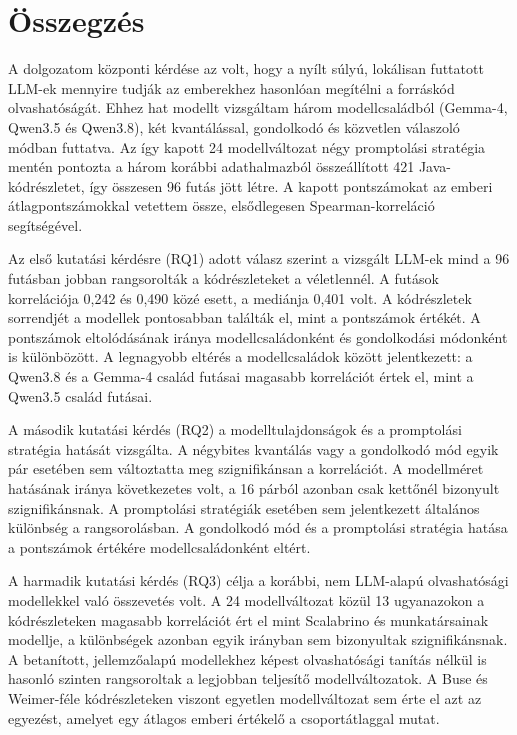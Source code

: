 \documentclass[
]{elteikthesis}[2024/04/26]
\begin{document}
\chapter{Összegzés}
\label{ch:conclusion}

A dolgozatom központi kérdése az volt, hogy a nyílt súlyú, lokálisan futtatott LLM-ek mennyire tudják
az emberekhez hasonlóan megítélni a forráskód olvashatóságát.
Ehhez hat modellt vizsgáltam három modellcsaládból (Gemma-4, Qwen3.5 és Qwen3.8),
két kvantálással, gondolkodó és közvetlen válaszoló módban futtatva.
Az így kapott 24 modellváltozat négy promptolási stratégia mentén pontozta a három korábbi adathalmazból összeállított
421 Java-kódrészletet, így összesen 96 futás jött létre.
A kapott pontszámokat az emberi átlagpontszámokkal vetettem össze, elsődlegesen Spearman-korreláció segítségével.

Az első kutatási kérdésre (RQ1) adott válasz szerint a vizsgált LLM-ek
mind a 96 futásban jobban rangsorolták a kódrészleteket a véletlennél.
A futások korrelációja 0,242 és 0,490 közé esett, a mediánja 0,401 volt.
A kódrészletek sorrendjét a modellek pontosabban találták el, mint a pontszámok értékét.
A pontszámok eltolódásának iránya modellcsaládonként és gondolkodási módonként is különbözött.
A legnagyobb eltérés a modellcsaládok között jelentkezett:
a Qwen3.8 és a Gemma-4 család futásai magasabb korrelációt értek el,
mint a Qwen3.5 család futásai.

A második kutatási kérdés (RQ2) a modelltulajdonságok és a promptolási stratégia hatását vizsgálta.
A négybites kvantálás vagy a gondolkodó mód egyik pár esetében sem változtatta meg szignifikánsan a korrelációt.
A modellméret hatásának iránya következetes volt, a 16 párból azonban csak kettőnél bizonyult szignifikánsnak.
A promptolási stratégiák esetében sem jelentkezett általános különbség a rangsorolásban.
A gondolkodó mód és a promptolási stratégia hatása a pontszámok értékére modellcsaládonként eltért.

A harmadik kutatási kérdés (RQ3) célja a korábbi, nem LLM-alapú olvashatósági modellekkel való összevetés volt.
A 24 modellváltozat közül 13 ugyanazokon a kódrészleteken magasabb korrelációt ért el mint Scalabrino és munkatársainak modellje,
a különbségek azonban egyik irányban sem bizonyultak szignifikánsnak.
A betanított, jellemzőalapú modellekhez képest olvashatósági tanítás nélkül is
hasonló szinten rangsoroltak a legjobban teljesítő modellváltozatok.
A Buse és Weimer-féle kódrészleteken viszont egyetlen modellváltozat sem érte el azt az egyezést,
amelyet egy átlagos emberi értékelő a csoportátlaggal mutat.
\end{document}
